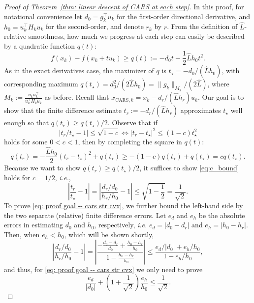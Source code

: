 \begin{proof}[Proof of Theorem~\ref{thm: linear descent of CARS at each step}]
    In this proof, for notational convenience let $d_{0} = g_k^\top {u}_k$ for the first-order directional derivative, and $h_{0} = {u}_k^\top H_k {u}_k$ for the second-order, and denote $r_k$ by $r$. From the definition of $\hat{L}$-relative smoothness, how much we progress at each step can easily be described by a quadratic function $q(t)$:
    \[
        f(x_k) - f(x_k+tu_k) \geq q(t) := -d_{0}t - \frac{1}{2}\hat{L}h_{0} t^2.
    \]
    As in the exact derivatives case, the maximizer of $q$ is $t_\star = -d_{0}/ (\hat{L} h_{0})$, with corresponding maximum $q(t_\star) = d_{0}^2/(2 \hat{L} h_{0}) = \|g_k\|_{M_k}/(2\hat{L})$, where  $M_k := \frac{u_k u_k^{\top}}{u_k^{\top} H_k u_k}$ as before. Recall that $x_{\mathrm{CARS},k} = x_k-d_{r}/(\hat{L}h_{r}) u_k$. Our goal is to show that the finite difference estimate $t_{r} := -d_{r}/(\hat{L}h_{r})$ approximates $t_\star$ well enough so that $q(t_{r}) \geq q(t_\star)/2$.
    Observe that if
    \begin{equation}
        |t_{r} / t_\star - 1| \leq \sqrt{1-c} \iff |t_{r}- t_\star|^2 \leq (1-c)t_\star^2
        \label{eq:c_bound}
    \end{equation}
    holds for some $0 <c<1$, then by completing the square in $q(t)$:
    \begin{equation*}
        q(t_r) = -\frac{\hat{L}h_0}{2}(t_r -t_\star)^2 + q(t_\star) \geq -(1-c)q(t_\star) + q(t_\star) = cq(t_\star).
    \end{equation*}
    Because we want to show $q(t_r) \geq q(t_\star)/2$, it suffices to show \eqref{eq:c_bound} holds for $c=1/2$, {\em i.e.},
    \begin{equation}\label{eq: proof goal -- cars str cvx}
        \left|\frac{t_r}{t_\star} -1\right| = \left|\frac{d_r /d_0 }{ h_r / h_0} -1\right| \leq \sqrt{1 - \frac{1}{2}} = \frac{1}{\sqrt{2}}.
    \end{equation}
    To prove \eqref{eq: proof goal -- cars str cvx}, we further bound the left-hand side by the two separate (relative) finite difference errors.
    Let $e_d$ and $e_h$ be the absolute errors in estimating $d_{0}$ and $h_{0}$, respectively, {\em i.e.} $e_d = |d_{0} - d_r|$ and $e_h = |h_{0} - h_r|$.
    Then, when $e_h < h_0$, which will be shown shortly,
    \begin{equation*}
        \left|\frac{d_r /d_{0} }{ h_r / h_{0}}-1\right|
        = \left| \frac{ -\frac{d_0-d_r}{d_0} + \frac{h_0-h_r}{h_0}}{1 - \frac{h_0-h_r}{h_0}}\right|
        \leq \frac{e_d/|d_{0}|+e_h/h_{0}}{1-e_h/h_{0}},
    \end{equation*}
    and thus, for \eqref{eq: proof goal -- cars str cvx} we only need to prove
    \begin{equation}\label{eq: sufficient condition for mu}
        \frac{e_d}{|d_{0}|} + \left(1+\frac{1}{\sqrt{2}}\right)\frac{e_h}{h_{0}} \leq \frac{1}{\sqrt{2}}.
    \end{equation}


\end{proof}
